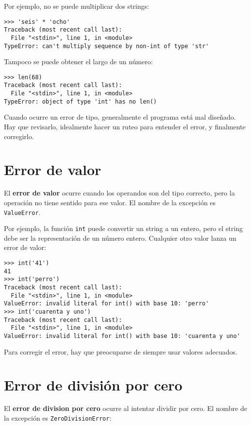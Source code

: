 Por ejemplo, no se puede multiplicar dos strings:

\begin{lstlisting}
>>> 'seis' * 'ocho'
Traceback (most recent call last):
  File "<stdin>", line 1, in <module>
TypeError: can't multiply sequence by non-int of type 'str'
\end{lstlisting}

Tampoco se puede obtener el largo de un número:

\begin{lstlisting}
>>> len(68)
Traceback (most recent call last):
  File "<stdin>", line 1, in <module>
TypeError: object of type 'int' has no len()
\end{lstlisting}

Cuando ocurre un error de tipo, generalmente el programa está mal
diseñado. Hay que revisarlo, idealmente hacer un ruteo para entender el
error, y finalmente corregirlo.

\section{Error de valor}

El \textbf{error de valor} ocurre cuando los operandos son del tipo
correcto, pero la operación no tiene sentido para ese valor.
El nombre de la excepción es \lstinline!ValueError!.

Por ejemplo, la función \lstinline!int! puede convertir un string a un
entero, pero el string debe ser la representación de un número entero.
Cualquier otro valor lanza un error de valor:

\begin{lstlisting}
>>> int('41')
41
>>> int('perro')
Traceback (most recent call last):
  File "<stdin>", line 1, in <module>
ValueError: invalid literal for int() with base 10: 'perro'
>>> int('cuarenta y uno')
Traceback (most recent call last):
  File "<stdin>", line 1, in <module>
ValueError: invalid literal for int() with base 10: 'cuarenta y uno'
\end{lstlisting}

Para corregir el error, hay que preocuparse de siempre usar valores
adecuados.

\section{Error de división por cero}

El \textbf{error de division por cero} ocurre al intentar dividir por cero.
El nombre de la excepción es \lstinline!ZeroDivisionError!:

